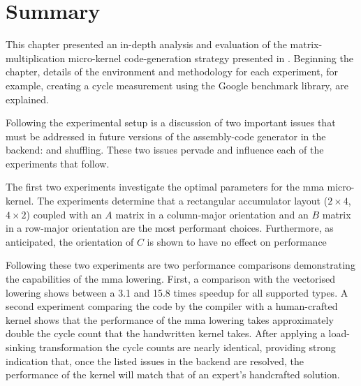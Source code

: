 \documentclass[\main/thesis.tex]{subfiles}
\begin{document}
\section{Summary}
This chapter presented an in-depth analysis and evaluation of the matrix-multiplication micro-kernel code-generation strategy presented in .
Beginning the chapter, details of the environment and methodology for each experiment, for example, creating a cycle measurement using the Google benchmark library, are explained.

Following the experimental setup is a discussion of two important issues that must be addressed in future versions of the assembly-code generator in the backend:  and shuffling.
These two issues pervade and influence each of the experiments that follow.

The first two experiments investigate the optimal parameters for the \gls{mma} micro-kernel.
The experiments determine that a rectangular accumulator layout ($2 \times 4$, $4 \times 2$) coupled with an $A$ matrix in a column-major orientation and an $B$ matrix in a row-major orientation are the most performant choices.
Furthermore, as anticipated, the orientation of $C$ is shown to have no effect on performance

Following these two experiments are two performance comparisons demonstrating the capabilities of the \gls{mma} \gls{lowering}.
First, a comparison with the vectorised \gls{lowering} shows between a 3.1 and 15.8 times speedup for all supported types.
A second experiment comparing the code  by the compiler with a human-crafted kernel shows that the performance of the \gls{mma} \gls{lowering} takes approximately double the cycle count that the handwritten kernel takes.
After applying a load-sinking transformation the cycle counts are nearly identical, providing strong indication that, once the listed issues in the backend are resolved, the performance of the kernel will match that of an expert's handcrafted solution.
\end{document}
